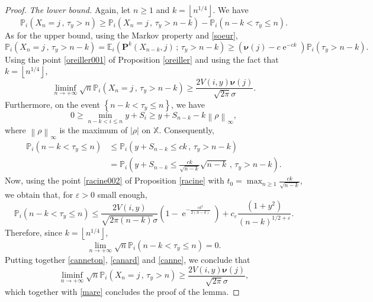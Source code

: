 \documentclass[12pt]{amsart}
\theoremstyle{definition}
\numberwithin{equation}{section}
\newcommand*{\abs}[1]{\left\lvert#1\right\rvert}
\newcommand*{\norm}[1]{\left\lVert#1\right\rVert}
\newcommand*{\pent}[1]{\left\lfloor#1\right\rfloor}
\def\bb#1{\mathbb{#1}}
\def\bs#1{\boldsymbol{#1}}
\def\bf#1{\mathbf{#1}}
\def\geq{\geqslant}
\def\leq{\leqslant}
\newcommand\ee{\varepsilon}
\DeclareMathOperator{\e}{e}
\begin{document}
\begin{proof}
\textit{The lower bound.} Again, let $n \geq 1$  and $k=\pent{n^{1/4}}$. We have
\begin{equation}
	\label{canneton}
	\bb P_i \left( X_n = j \,,\, \tau_y > n \right) \geq \bb P_i \left( X_n = j \,,\, \tau_y > n-k \right) - \bb P_i \left( n-k < \tau_y \leq n \right).
\end{equation}
As for the upper bound, using the Markov property and \eqref{soeur},
\[
\bb P_i \left( X_n = j \,,\, \tau_y > n-k \right) = \bb E_i \left( \bf P^k \left( X_{n-k}, j \right) \,;\, \tau_y > n-k \right) \geq \left( \bs \nu(j) - c\e^{-ck} \right) \bb P_i \left( \tau_y > n-k \right).
\]
Using the point \ref{oreiller001} of Proposition \ref{oreiller} and using the fact that $k=\pent{n^{1/4}}$,
\begin{equation}
	\liminf_{n\to+\infty} \sqrt{n} \bb P_i \left( X_n = j \,,\, \tau_y > n-k \right) \geq \frac{2V(i,y) \bs \nu (j)}{\sqrt{2\pi} \sigma}.
	\label{canard}
\end{equation}
Furthermore, on the event $\left\{ n-k < \tau_y \leq n \right\}$, we have
\[
0 \geq \min_{n-k < i \leq n} y+S_i \geq y+S_{n-k} - k \norm{\rho}_{\infty},
\]
where $\norm{\rho}_{\infty}$ is the maximum of $\abs{\rho}$ on $\bb X$. Consequently,
\begin{align*}
	\bb P_i \left( n-k < \tau_y \leq n \right) &\leq \bb P_i \left( y+S_{n-k} \leq c k \,,\, \tau_y > n-k \right) \\
	&= \bb P_i \left( y+S_{n-k} \leq \frac{c k}{\sqrt{n-k}} \sqrt{n-k} \,,\, \tau_y > n-k \right).
\end{align*}
Now, using the point \ref{racine002} of Proposition \ref{racine} with $t_0 = \max_{n\geq 1} \frac{ck}{\sqrt{n-k}}$, we obtain that, for $\ee > 0$ small enough,
\[
\bb P_i \left( n-k < \tau_y \leq n \right) \leq \frac{2V(i,y)}{\sqrt{2\pi (n-k)}\sigma} \left( 1-\e^{-\frac{ck^2}{2(n-k)}} \right) + c_{\ee} \frac{\left( 1+y^2 \right)}{(n-k)^{1/2+\ee}}.
\]
Therefore, since $k = \pent{n^{1/4}}$,
\begin{equation}
	\label{canne}
	\lim_{n\to+\infty} \sqrt{n} \bb P_i \left( n-k < \tau_y \leq n \right) = 0.
\end{equation}
Putting together \eqref{canneton}, \eqref{canard} and \eqref{canne}, we conclude that
\[
\liminf_{n\to+\infty} \sqrt{n} \bb P_i \left( X_n = j \,,\, \tau_y > n \right) \geq \frac{2V(i,y) \bs \nu (j)}{\sqrt{2\pi} \sigma},
\]
which together with \eqref{mare} concludes the proof of the lemma.
\end{proof}
\end{document}
